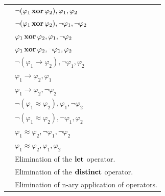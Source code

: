 \begin{xltabular}{\linewidth}{l X}
 &
$ \neg (\varphi_1 \,\mathbf{xor}\, \varphi_2) , \varphi_1 , \varphi_2 $ \\
 &
$ \neg (\varphi_1 \,\mathbf{xor}\, \varphi_2)
, \neg \varphi_1, \neg \varphi_2 $ \\
 &
$ \varphi_1 \,\mathbf{xor}\, \varphi_2, \varphi_1 , \neg \varphi_2 $ \\
 &
$ \varphi_1 \,\mathbf{xor}\, \varphi_2, \neg \varphi_1 , \varphi_2 $ \\
 &
$ \neg (\varphi_1 \rightarrow \varphi_2), \neg \varphi_1 , \varphi_2 $ \\
 &
$ \varphi_1 \rightarrow \varphi_2, \varphi_1 $ \\
 &
$ \varphi_1 \rightarrow \varphi_2, \neg \varphi_2 $ \\
 &
$\neg (\varphi_1 ≈ \varphi_2) , \varphi_1 , \neg \varphi_2$ \\
 &
$\neg (\varphi_1 ≈ \varphi_2) , \neg \varphi_1 , \varphi_2$ \\
 &
$\varphi_1 ≈ \varphi_2 , \neg \varphi_1 , \neg \varphi_2$ \\
 &
$\varphi_1 ≈ \varphi_2 , \varphi_1 , \varphi_2$ \\
 & Elimination of the $\mathbf{let}$ operator.  \\
 & Elimination of the $\mathbf{distinct}$ operator.  \\
 & Elimination of n-ary application of operators. \\
\end{xltabular}

